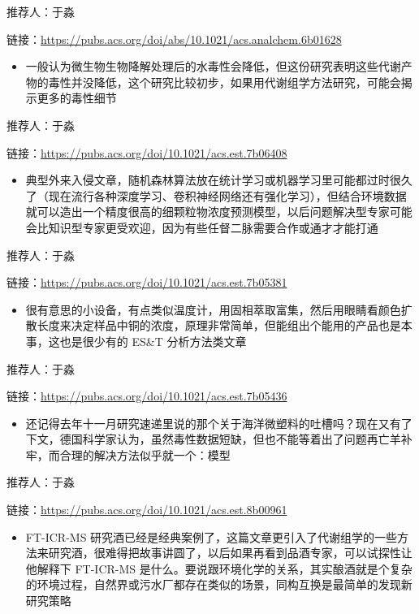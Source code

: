 \documentclass[
]{book}
\providecommand{\tightlist}{%
  \setlength{\itemsep}{0pt}\setlength{\parskip}{0pt}}
\begin{document}
推荐人：于淼

链接：\url{https://pubs.acs.org/doi/abs/10.1021/acs.analchem.6b01628}

\begin{itemize}
\tightlist
\item
  一般认为微生物生物降解处理后的水毒性会降低，但这份研究表明这些代谢产物的毒性并没降低，这个研究比较初步，如果用代谢组学方法研究，可能会揭示更多的毒性细节
\end{itemize}

推荐人：于淼

链接：\url{https://pubs.acs.org/doi/10.1021/acs.est.7b06408}

\begin{itemize}
\tightlist
\item
  典型外来入侵文章，随机森林算法放在统计学习或机器学习里可能都过时很久了（现在流行各种深度学习、卷积神经网络还有强化学习），但结合环境数据就可以造出一个精度很高的细颗粒物浓度预测模型，以后问题解决型专家可能会比知识型专家更受欢迎，因为有些任督二脉需要合作或通才才能打通
\end{itemize}

推荐人：于淼

链接：\url{https://pubs.acs.org/doi/10.1021/acs.est.7b05381}

\begin{itemize}
\tightlist
\item
  很有意思的小设备，有点类似温度计，用固相萃取富集，然后用眼睛看颜色扩散长度来决定样品中铜的浓度，原理非常简单，但能组出个能用的产品也是本事，这也是很少有的 ES\&T 分析方法类文章
\end{itemize}

推荐人：于淼

链接：\url{https://pubs.acs.org/doi/10.1021/acs.est.7b05436}

\begin{itemize}
\tightlist
\item
  还记得去年十一月研究速递里说的那个关于海洋微塑料的吐槽吗？现在又有了下文，德国科学家认为，虽然毒性数据短缺，但也不能等着出了问题再亡羊补牢，而合理的解决方法似乎就一个：模型
\end{itemize}

推荐人：于淼

链接：\url{https://pubs.acs.org/doi/10.1021/acs.est.8b00961}

\begin{itemize}
\tightlist
\item
  FT-ICR-MS 研究酒已经是经典案例了，这篇文章更引入了代谢组学的一些方法来研究酒，很难得把故事讲圆了，以后如果再看到品酒专家，可以试探性让他解释下 FT-ICR-MS 是什么。要说跟环境化学的关系，其实酿酒就是个复杂的环境过程，自然界或污水厂都存在类似的场景，同构互换是最简单的发现新研究策略
\end{itemize}
\end{document}
